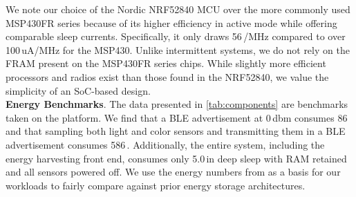 We note our choice of the Nordic NRF52840 MCU over the more commonly used MSP430FR series
because of its higher efficiency in active mode while offering comparable sleep currents.
Specifically, it only draws 56\,\uA/MHz compared to over 100\,uA/MHz
for the MSP430. Unlike intermittent systems,
we do not rely on the FRAM present on the MSP430FR series chips. While
slightly more efficient
processors and radios exist than those found in the NRF52840,
we value the simplicity of an SoC-based design. \\

\vspace{-6pt}
\noindent
\textbf{Energy Benchmarks}.
The data presented in \cref{tab:components} are benchmarks taken
on the \name platform. We find that a BLE advertisement at 0\,dbm consumes
86\,\uJ and that sampling both light and color sensors and transmitting
them in a BLE advertisement consumes 586\,\uJ. Additionally, the entire system, including
the energy harvesting front end, consumes only 5.0\,\uW in deep sleep with RAM
retained and all sensors powered off. We use the energy numbers from \name as a basis
for our workloads to fairly compare against prior energy storage architectures.
%
%
